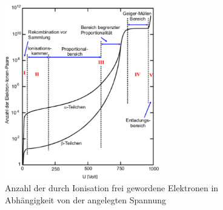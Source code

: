 \begin{figure}[h!]
	\centering
	\includegraphics[width=0.6\textwidth]{Spannungsabhangigkeit.pdf}
	\caption{Anzahl der durch Ionisation frei gewordene Elektronen in Abhängigkeit von der angelegten Spannung}
	\label{fig:DependenceVoltage}
\end{figure}
